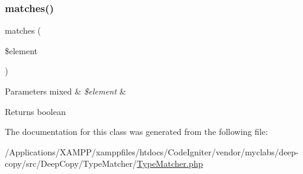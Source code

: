 \subsubsection{\texorpdfstring{matches()}{matches()}}
{\footnotesize\ttfamily matches (\begin{DoxyParamCaption}\item[{}]{\$element }\end{DoxyParamCaption})}


\begin{DoxyParams}[1]{Parameters}
mixed & {\em \$element} & \\
\hline
\end{DoxyParams}
\begin{DoxyReturn}{Returns}
boolean 
\end{DoxyReturn}


The documentation for this class was generated from the following file\+:\begin{DoxyCompactItemize}
\item 
/\+Applications/\+X\+A\+M\+P\+P/xamppfiles/htdocs/\+Code\+Igniter/vendor/myclabs/deep-\/copy/src/\+Deep\+Copy/\+Type\+Matcher/\mbox{\hyperlink{_type_matcher_8php}{Type\+Matcher.\+php}}\end{DoxyCompactItemize}

